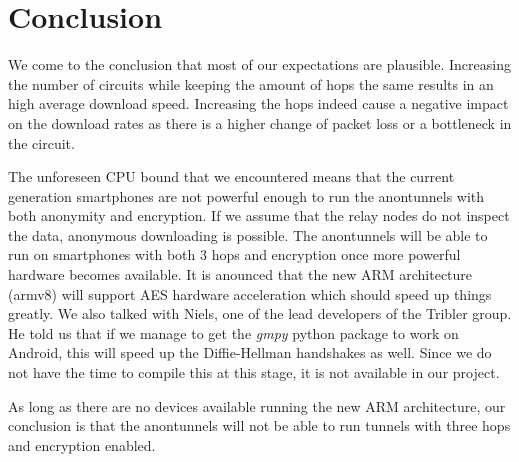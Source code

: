 \section{Conclusion}
	We come to the conclusion that most of our expectations are plausible. Increasing the number of circuits while keeping the amount of hops the same results in an high average download speed. Increasing the hops indeed cause a negative impact on the download rates as there is a higher change of packet loss or a bottleneck in the circuit.
	
	The unforeseen CPU bound that we encountered means that the current generation smartphones are not powerful enough to run the anontunnels with both anonymity and encryption. If we assume that the relay nodes do not inspect the data, anonymous downloading is possible. The anontunnels will be able to run on smartphones with both 3 hops and encryption once more powerful hardware becomes available. It is anounced \cite{armv8anouncement} that the new ARM architecture (armv8) will support AES hardware acceleration which should speed up things greatly. We also talked with Niels, one of the lead developers of the Tribler group. He told us that if we manage to get the \emph{gmpy} python package to work on Android, this will speed up the Diffie-Hellman handshakes as well. Since we do not have the time to compile this at this stage, it is not available in our project.	
	
	As long as there are no devices available running the new ARM architecture, our conclusion is that the anontunnels will not be able to run tunnels with three hops and encryption enabled.